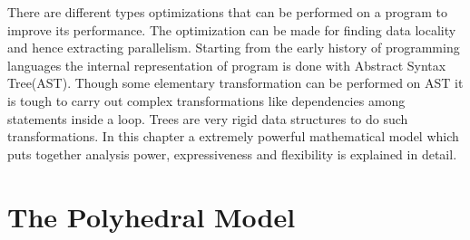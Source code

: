 \documentclass[a4paper,12pt]{book}
\begin{document}
There are different types optimizations that can be performed on a program to improve its
performance. The optimization can be made for finding data locality and hence extracting
parallelism. Starting from the early history of programming languages the internal representation
of program is done with Abstract Syntax Tree(AST). Though some elementary transformation can
be performed on AST it is tough to carry out complex transformations like dependencies among
statements inside a loop. Trees are very rigid data structures to do such transformations.
In this chapter a extremely powerful mathematical model which puts together analysis power,
expressiveness and flexibility is explained in detail.
\chapter{The Polyhedral Model}
\end{document}
